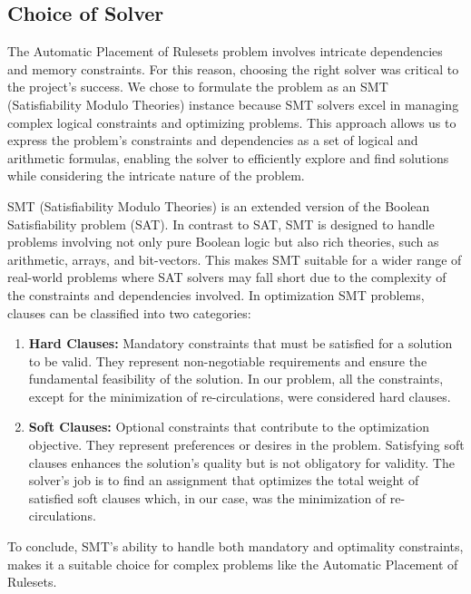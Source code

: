 \subsection{Choice of Solver}

The Automatic Placement of Rulesets problem involves intricate dependencies and memory constraints. For this reason, choosing the right solver was critical to the project's success. We chose to formulate the problem as an SMT (Satisfiability Modulo Theories) instance because SMT solvers excel in managing complex logical constraints and optimizing problems. This approach allows us to express the problem's constraints and dependencies as a set of logical and arithmetic formulas, enabling the solver to efficiently explore and find solutions while considering the intricate nature of the problem.

SMT (Satisfiability Modulo Theories) is an extended version of the Boolean Satisfiability problem (SAT). In contrast to SAT, SMT is designed to handle problems involving not only pure Boolean logic but also rich theories, such as arithmetic, arrays, and bit-vectors. This makes SMT suitable for a wider range of real-world problems where SAT solvers may fall short due to the complexity of the constraints and dependencies involved. In optimization SMT problems, clauses can be classified into two categories:

\begin{enumerate}
    \item \textbf{Hard Clauses:} Mandatory constraints that must be satisfied for a solution to be valid. They represent non-negotiable requirements and ensure the fundamental feasibility of the solution. In our problem, all the constraints, except for the minimization of re-circulations, were considered hard clauses.

    \item \textbf{Soft Clauses:} Optional constraints that contribute to the optimization objective. They represent preferences or desires in the problem. Satisfying soft clauses enhances the solution's quality but is not obligatory for validity. The solver's job is to find an assignment that optimizes the total weight of satisfied soft clauses which, in our case, was the minimization of re-circulations.
\end{enumerate}

To conclude, SMT's ability to handle both mandatory and optimality constraints, makes it a suitable choice for complex problems like the Automatic Placement of Rulesets.

